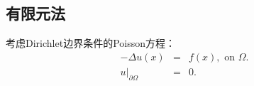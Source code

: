\documentclass{article}
\begin{document}






\subsection{有限元法}
考虑Dirichlet边界条件的Poisson方程：
\begin{eqnarray}
-\Delta u(x) &=& f(x),\text{ on } \Omega.\label{eq:P}\\
u|_{\partial\Omega} &=& 0.
\end{eqnarray}
\end{document}
